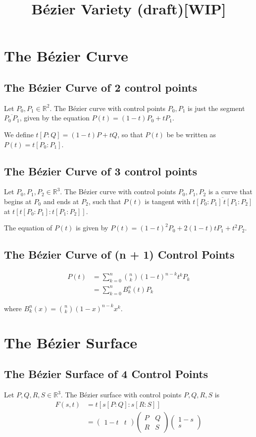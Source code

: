 \documentclass{article}
\title{Bézier Variety (draft)[WIP]}
\def\mat#1{\left(\begin{matrix}#1\end{matrix}\right)}
\begin{document}
\maketitle


\section{The Bézier Curve}

\subsection{The Bézier Curve of 2 control points}
Let $P_0, P_1 \in \mathbb R^2$. The Bézier curve with control points $P_0, P_1$ is just the segment $\overline {P_0 \, P_1}$,
given by the equation $P(t) = (1 - t) P_0 + t P_1$.

We define $t[P : Q] = (1 - t) P + t Q$, so that $P(t)$ be be written as $P(t) = t[P_0 : P_1]$.

\subsection{The Bézier Curve of 3 control points}
Let $P_0, P_1, P_2 \in \mathbb R^3$. The Bézier curve with control points $P_0, P_1, P_2$ is a curve that begins at $P_0$ and ends at $P_2$,
such that $P(t)$ is tangent with $\overline {t[P_0 : P_1] \, t[P_1 : P_2]}$ at $t[t[P_0 : P_1] : t[P_1 : P_2]]$.

The equation of $P(t)$ is given by $P(t) = (1-t)^2 P_0 + 2 (1-t) t P_1 + t^2 P_2$.

\subsection{The Bézier Curve of (n + 1) Control Points}
\begin{align*}
    P(t) &= \sum_{k=0}^n {n \choose k} (1-t)^{n-k} t^k P_k \\
        &= \sum_{k=0}^n B^n_k (t) P_k
\end{align*}

where $B^n_k (x) = {n \choose k} (1 - x)^{n-k} x^k$.

\section{The Bézier Surface}

\subsection{The Bézier Surface of 4 Control Points}
Let $P, Q, R, S \in \mathbb R^3$. The Bézier surface with control points $P, Q, R, S$ is
\begin{align*}
    F(s, t)
        &= t[s[P : Q] : s[R : S]] \\
        &= \mat{1 - t & t} \mat{P & Q \\ R & S} \mat{1 - s \\ s}
\end{align*}
\end{document}
